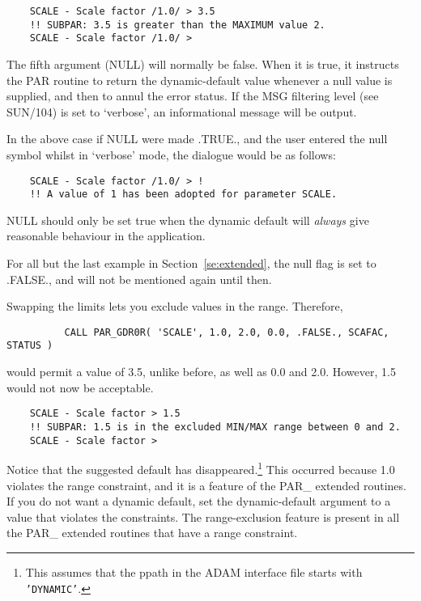 \documentclass[twoside,11pt]{article}
\newcommand{\xref}[3]{#1}
\newcommand{\latex}[1]{#1}
\begin{document}
\begin{verbatim}
    SCALE - Scale factor /1.0/ > 3.5
    !! SUBPAR: 3.5 is greater than the MAXIMUM value 2.
    SCALE - Scale factor /1.0/ >
\end{verbatim}

The fifth argument (NULL) will normally be false.  When it is true, it
instructs the PAR routine to return the dynamic-default value whenever a
null value is supplied, and then to annul the error status. If the 
\xref{MSG filtering level}{sun104}{conditional_message_reporting}
\latex{ (see SUN/104)} is set to `verbose', an informational message will be 
output.

In the above case if NULL were made .TRUE., and the user entered the null 
symbol whilst in `verbose' mode, the dialogue would be as follows:

\begin{verbatim}
    SCALE - Scale factor /1.0/ > !
    !! A value of 1 has been adopted for parameter SCALE.
\end{verbatim}

NULL should only be set true when the dynamic default will {\em always\/} give
reasonable behaviour in the application.  

For all but the last example in Section~\ref{se:extended}, the null flag
is set to .FALSE., and will not be mentioned again until then.

Swapping the limits lets you exclude values in the range.  Therefore, 

\begin{verbatim}
          CALL PAR_GDR0R( 'SCALE', 1.0, 2.0, 0.0, .FALSE., SCAFAC, STATUS )
\end{verbatim}

would permit a value of 3.5, unlike before, as well as 0.0 and 2.0. 
However, 1.5 would not now be acceptable. 

\begin{verbatim}
    SCALE - Scale factor > 1.5
    !! SUBPAR: 1.5 is in the excluded MIN/MAX range between 0 and 2.
    SCALE - Scale factor >
\end{verbatim} 

Notice that the suggested default has disappeared.\footnote{This assumes
that the ppath in the ADAM interface file starts with {\tt 'DYNAMIC'}.} 
This occurred because 1.0 violates the range constraint, and it is a
feature of the PAR\_ extended routines.  If you do not want a dynamic
default, set the dynamic-default argument to a value that violates the
constraints.  The range-exclusion feature is present in all the PAR\_
extended routines that have a range constraint. 
\end{document}
